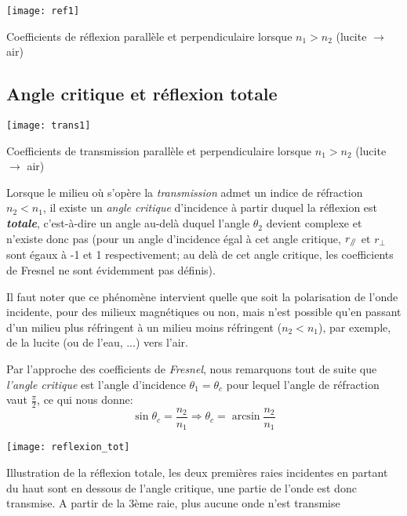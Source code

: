
\begin{marginfigure}[-19cm]
	\texttt{[image: ref1]}
	\caption{Coefficients de réflexion parallèle et perpendiculaire lorsque $n_1>n_2$ (lucite $\rightarrow$ air)}
	\label{fig_ref3}
\end{marginfigure} 

\subsection{Angle critique et réflexion totale}
\begin{marginfigure}[-5cm]
	\texttt{[image: trans1]}
	\caption{Coefficients de transmission parallèle et perpendiculaire lorsque $n_1>n_2$ (lucite $\rightarrow$ air)}
\end{marginfigure} 
Lorsque le milieu où s'opère la \textit{transmission} admet un indice de réfraction $n_{2}<n_{1}$, il existe un \textit{angle critique} d'incidence à partir duquel la réflexion est \textit{\textbf{totale}}, c'est-à-dire un angle au-delà duquel l'angle $\theta_2$ devient complexe et n'existe donc pas (pour un angle d'incidence égal à cet angle critique, $r_{\mathbin{/\mkern-5mu/}}$ et $r_{\perp}$ sont égaux à  -1 et 1 respectivement; au delà de cet angle critique, les coefficients de Fresnel ne sont évidemment pas définis). 

Il faut noter que ce phénomène intervient quelle que soit la polarisation de l'onde incidente, pour des milieux magnétiques ou non, mais n'est possible qu'en passant d'un milieu plus réfringent à un milieu moins réfringent ($n_{2} < n_1$), par exemple, de la lucite (ou de l'eau, ...) vers l'air.

Par l'approche des coefficients de \textit{Fresnel}, nous remarquons tout de suite que \textit{l'angle critique} est l'angle d'incidence $\theta_{1} = \theta_{c}$ pour lequel l'angle de réfraction vaut $\frac{\pi}{2}$, ce qui nous donne: 
\[\sin \theta_{c} = \frac{n_{2}}{n_{1}} \Rightarrow \theta_{c} = \arcsin \frac{n_{2}}{n_{1}}\]
\begin{marginfigure}[-3cm]
	\texttt{[image: reflexion\_tot]}
	\caption{Illustration de la réflexion totale, les deux premières raies incidentes en partant du haut sont en dessous de l'angle critique, une partie de l'onde est donc transmise. A partir de la 3ème raie, plus aucune onde n'est transmise}
\end{marginfigure}
